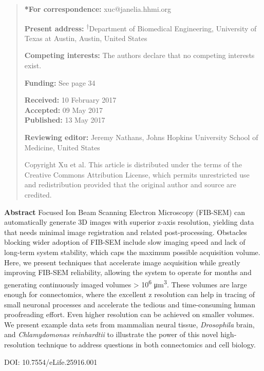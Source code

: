 \documentclass{article}
\begin{document}
\begin{quote}\small
\noindent\textbf{*For correspondence:} xuc@janelia.hhmi.org

\noindent\textbf{Present address:} \textsuperscript{†}Department of Biomedical Engineering, University of Texas at Austin, Austin, United States

\noindent\textbf{Competing interests:} The authors declare that no competing interests exist.

\noindent\textbf{Funding:} See page 34

\noindent\textbf{Received:} 10 February 2017\\
\textbf{Accepted:} 09 May 2017\\
\textbf{Published:} 13 May 2017

\noindent\textbf{Reviewing editor:} Jeremy Nathans, Johns Hopkins University School of Medicine, United States

\noindent Copyright Xu et al. This article is distributed under the terms of the Creative Commons Attribution License, which permits unrestricted use and redistribution provided that the original author and source are credited.
\end{quote}

\noindent\textbf{Abstract} Focused Ion Beam Scanning Electron Microscopy (FIB-SEM) can automatically generate 3D images with superior z-axis resolution, yielding data that needs minimal image registration and related post-processing. Obstacles blocking wider adoption of FIB-SEM include slow imaging speed and lack of long-term system stability, which caps the maximum possible acquisition volume. Here, we present techniques that accelerate image acquisition while greatly improving FIB-SEM reliability, allowing the system to operate for months and generating continuously imaged volumes > 10\textsuperscript{6} μm\textsuperscript{3}. These volumes are large enough for connectomics, where the excellent z resolution can help in tracing of small neuronal processes and accelerate the tedious and time-consuming human proofreading effort. Even higher resolution can be achieved on smaller volumes. We present example data sets from mammalian neural tissue, \emph{Drosophila} brain, and \emph{Chlamydomonas reinhardtii} to illustrate the power of this novel high-resolution technique to address questions in both connectomics and cell biology.

\noindent DOI: 10.7554/eLife.25916.001
\end{document}
